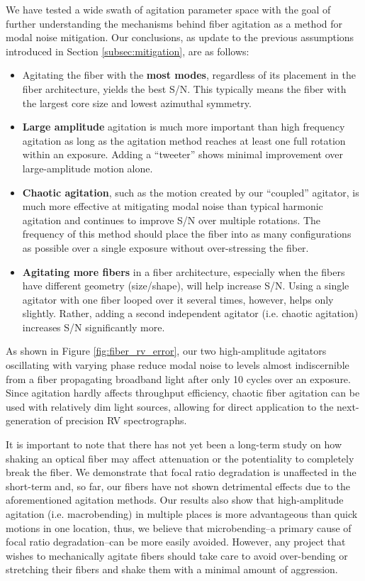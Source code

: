 \documentclass[twocolumn]{emulateapj}
\begin{document}
We have tested a wide swath of agitation parameter space with the goal of further understanding the mechanisms behind fiber agitation as a method for modal noise mitigation. Our conclusions, as update to the previous assumptions introduced in Section \ref{subsec:mitigation}, are as follows:
\begin{itemize}
\item Agitating the fiber with the \textbf{most modes}, regardless of its placement in the fiber architecture, yields the best S/N. This typically means the fiber with the largest core size and lowest azimuthal symmetry.
\item \textbf{Large amplitude} agitation is much more important than high frequency agitation as long as the agitation method reaches at least one full rotation within an exposure. Adding a ``tweeter'' shows minimal improvement over large-amplitude motion alone.
\item \textbf{Chaotic agitation}, such as the motion created by our ``coupled'' agitator, is much more effective at mitigating modal noise than typical harmonic agitation and continues to improve S/N over multiple rotations. The frequency of this method should place the fiber into as many configurations as possible over a single exposure without over-stressing the fiber.
\item \textbf{Agitating more fibers} in a fiber architecture, especially when the fibers have different geometry (size/shape), will help increase S/N. Using a single agitator with one fiber looped over it several times, however, helps only slightly. Rather, adding a second independent agitator (i.e. chaotic agitation) increases S/N significantly more.
\end{itemize}

As shown in Figure \ref{fig:fiber_rv_error}, our two high-amplitude agitators oscillating with varying phase reduce modal noise to levels almost indiscernible from a fiber propagating broadband light after only 10 cycles over an exposure. Since agitation hardly affects throughput efficiency, chaotic fiber agitation can be used with relatively dim light sources, allowing for direct application to the next-generation of precision RV spectrographs.

It is important to note that there has not yet been a long-term study on how shaking an optical fiber may affect attenuation or the potentiality to completely break the fiber. We demonstrate that focal ratio degradation is unaffected in the short-term and, so far, our fibers have not shown detrimental effects due to the aforementioned agitation methods. Our results also show that high-amplitude agitation (i.e. macrobending) in multiple places is more advantageous than quick motions in one location, thus, we believe that microbending--a primary cause of focal ratio degradation--can be more easily avoided. However, any project that wishes to mechanically agitate fibers should take care to avoid over-bending or stretching their fibers and shake them with a minimal amount of aggression.
\end{document}
